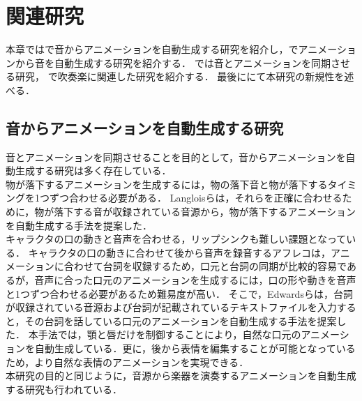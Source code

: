 \chapter{関連研究}
\label{chap:previousworks}
本章ではで音からアニメーションを自動生成する研究を紹介し，でアニメーションから音を自動生成する研究を紹介する．
では音とアニメーションを同期させる研究，
で吹奏楽に関連した研究を紹介する．
最後ににて本研究の新規性を述べる．

\section{音からアニメーションを自動生成する研究}\label{sec:generate_animation}
音とアニメーションを同期させることを目的として，音からアニメーションを自動生成する研究は多く存在している．\\
\indent
物が落下するアニメーションを生成するには，物の落下音と物が落下するタイミングを1つずつ合わせる必要がある．
Langloisら\cite{IFA}は，それらを正確に合わせるために，物が落下する音が収録されている音源から，物が落下するアニメーションを自動生成する手法を提案した．\\
%
\indent
キャラクタの口の動きと音声を合わせる，リップシンクも難しい課題となっている．
キャラクタの口の動きに合わせて後から音声を録音するアフレコは，アニメーションに合わせて台詞を収録するため，口元と台詞の同期が比較的容易であるが，音声に合った口元のアニメーションを生成するには，口の形や動きを音声と1つずつ合わせる必要があるため難易度が高い．
そこで，Edwardsら\cite{JALI}は，台詞が収録されている音源および台詞が記載されているテキストファイルを入力すると，その台詞を話している口元のアニメーションを自動生成する手法を提案した．
本手法では，顎と唇だけを制御することにより，自然な口元のアニメーションを自動生成している．更に，後から表情を編集することが可能となっているため，より自然な表情のアニメーションを実現できる．\\
%
\indent
本研究の目的と同じように，音源から楽器を演奏するアニメーションを自動生成する研究も行われている．
